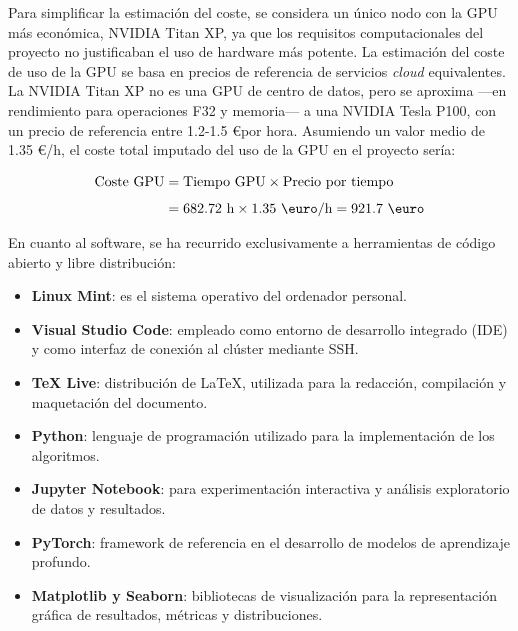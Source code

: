 \begin{itemize}
    
    Para simplificar la estimación del coste, se considera un único nodo con la GPU más económica, NVIDIA Titan XP, ya que los requisitos computacionales del proyecto no justificaban el uso de hardware más potente.  
    La estimación del coste de uso de la GPU se basa en precios de referencia de servicios \textit{cloud} equivalentes. La NVIDIA Titan XP no es una GPU de centro de datos, pero se aproxima ---en rendimiento para operaciones F32 y memoria--- a una NVIDIA Tesla P100, con un precio de referencia entre 1.2-1.5 \euro por hora. Asumiendo un valor medio de 1.35 \euro/h, el coste total imputado del uso de la GPU en el proyecto sería:

    \begin{align*}
        \textnormal{Coste GPU} &= \textnormal{Tiempo GPU} \times \textnormal{Precio por tiempo} \\[1ex]
        &= 682.72\text{ h} \times 1.35 \text{ \euro/h} = 921.7 \text{ \euro}
    \end{align*}
\end{itemize}

En cuanto al software, se ha recurrido exclusivamente a herramientas de código abierto y libre distribución:

\begin{itemize}
    \item \textbf{Linux Mint}: es el sistema operativo del ordenador personal. 
    \item \textbf{Visual Studio Code}: empleado como entorno de desarrollo integrado (IDE) y como interfaz de conexión al clúster mediante SSH.
    \item \textbf{TeX Live}: distribución de \LaTeX, utilizada para la redacción, compilación y maquetación del documento.
    \item \textbf{Python}: lenguaje de programación utilizado para la implementación de los algoritmos.
    \item \textbf{Jupyter Notebook}: para experimentación interactiva y análisis exploratorio de datos y resultados.
    \item \textbf{PyTorch}: framework de referencia en el desarrollo de modelos de aprendizaje profundo.
    \item \textbf{Matplotlib y Seaborn}: bibliotecas de visualización para la representación gráfica de resultados, métricas y distribuciones.
\end{itemize}

